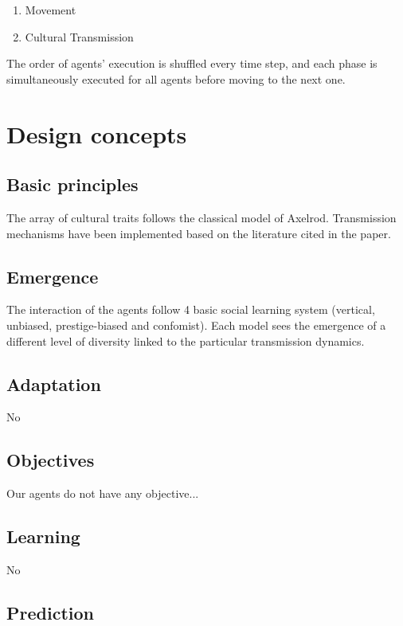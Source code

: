 \documentclass[11pt,a4paper,twocolumn,notitlepage]{article}
\begin{document}
\begin{enumerate}
\item{Movement}
\item{Cultural Transmission}
\end{enumerate}

The order of agents' execution is shuffled every time step, and each phase is simultaneously executed for all agents before moving to the next one.


\section{Design concepts}

\subsection{Basic principles}

The array of cultural traits follows the classical model of Axelrod. Transmission mechanisms have been implemented based on the literature cited in the paper.

\subsection{Emergence}

The interaction of the agents follow 4 basic social learning system (vertical, unbiased, prestige-biased and confomist). Each model sees the emergence of a different level of diversity linked to the particular transmission dynamics. 

\subsection{Adaptation}

No

\subsection{Objectives}

Our agents do not have any objective...

\subsection{Learning}

No

\subsection{Prediction}
\end{document}
